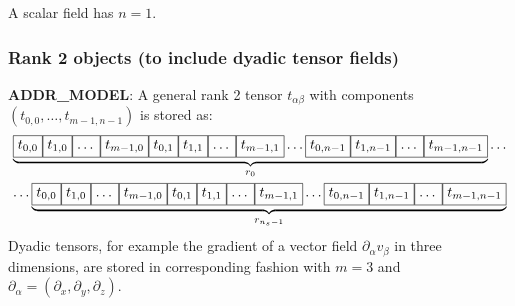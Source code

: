 A scalar field has $n=1$.


\subsubsection{Rank 2 objects (to include dyadic tensor fields)}

\textbf{ADDR\_MODEL}:
A general rank 2 tensor $t_{\alpha\beta}$ with components $(t_{0,0},
\ldots, t_{m-1,n-1})$ is stored as:
\begin{gather*}
\underbrace{
\boxed{t_{0,0}\vphantom{t_{m-1,n-1}}} \boxed{t_{1,0}\vphantom{t_{m-1,n-1}}}
\boxed{\ldots\vphantom{t_{m-1,n-1}}} \boxed{t_{m-1,0}\vphantom{t_{m-1,n-1}}}
\boxed{t_{0,1}\vphantom{t_{m-1,n-1}}} \boxed{t_{1,1}\vphantom{t_{m-1,n-1}}}
\boxed{\ldots\vphantom{t_{m-1,n-1}}} \boxed{t_{m-1,1}\vphantom{t_{m-1,n-1}}}
\ldots
\boxed{t_{0,n-1}\vphantom{t_{m-1,n-1}}}\boxed{t_{1,n-1} \vphantom{t_{m-1,n-1}}}
\boxed{\ldots\vphantom{t_{m-1,n-1}}} \boxed{t_{m-1,n-1}\vphantom{t_{m-1,n-1}}}
}_{r_0}
\ldots
\\
\ldots
\underbrace{
\boxed{t_{0,0}\vphantom{t_{m-1,n-1}}} \boxed{t_{1,0}\vphantom{t_{m-1,n-1}}}
\boxed{\ldots\vphantom{t_{m-1,n-1}}} \boxed{t_{m-1,0}\vphantom{t_{m-1,n-1}}}
\boxed{t_{0,1}\vphantom{t_{m-1,n-1}}} \boxed{t_{1,1}\vphantom{t_{m-1,n-1}}}
\boxed{\ldots\vphantom{t_{m-1,n-1}}} \boxed{t_{m-1,1}\vphantom{t_{m-1,n-1}}}
\ldots
\boxed{t_{0,n-1}\vphantom{t_{m-1,n-1}}}\boxed{t_{1,n-1} \vphantom{t_{m-1,n-1}}}
\boxed{\ldots\vphantom{t_{m-1,n-1}}} \boxed{t_{m-1,n-1}\vphantom{t_{m-1,n-1}}}
}_{r_{n_s-1}}
\end{gather*}
Dyadic tensors, for example the gradient of a vector field
$\partial_\alpha v_\beta$ in three dimensions, are stored in corresponding
fashion with $m=3$ and
$\partial_\alpha = (\partial_x, \partial_y, \partial_z)$.

